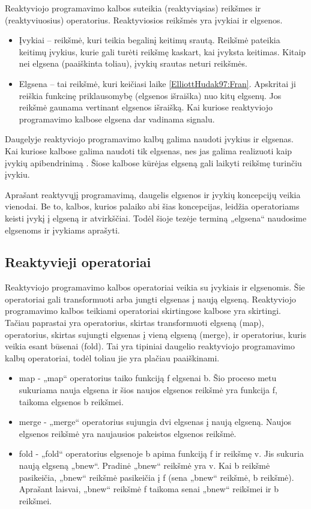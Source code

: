 Reaktyviojo programavimo kalbos suteikia (reaktyviąsias) reikšmes ir (reaktyviuosius) operatorius. Reaktyviosios reikšmės yra įvykiai ir elgsenos.

\begin{itemize}
  \item Įvykiai – reikšmė, kuri teikia begalinį keitimų srautą. Reikšmė pateikia keitimų įvykius, kurie gali turėti reikšmę kaskart, kai įvyksta keitimas. Kitaip nei elgsena (paaiškinta toliau), įvykių srautas neturi reikšmės.
  \item Elgsena – tai reikšmė, kuri keičiasi laike \ref{ElliottHudak97:Fran}. Apskritai ji reiškia funkcinę priklausomybę (elgsenos išraiška) nuo kitų elgsenų. Jos reikšmė gaunama vertinant elgsenos išraišką. Kai kuriose reaktyviojo programavimo kalbose elgsena dar vadinama signalu.
\end{itemize}

Daugelyje reaktyviojo programavimo kalbų galima naudoti įvykius ir elgsenas. Kai kuriose kalbose galima naudoti tik elgsenas, nes jas galima realizuoti kaip įvykių apibendrinimą \cite{Wan2002:EventDrivenFRP, CzaplickiC13:FRPGUI}. Šiose kalbose kūrėjas elgseną gali laikyti reikšmę turinčiu įvykiu.

Aprašant reaktyvųjį programavimą, daugelis elgsenos ir įvykių koncepcijų veikia vienodai. Be to, kalbos, kurios palaiko abi šias koncepcijas, leidžia operatoriams keisti įvykį į elgseną ir atvirkščiai. Todėl šioje tezėje terminą „elgsena“ naudosime elgsenoms ir įvykiams aprašyti.

\subsection{Reaktyvieji operatoriai}

Reaktyviojo programavimo kalbos operatoriai veikia su įvykiais ir elgsenomis. Šie operatoriai gali transformuoti arba jungti elgsenas į naują elgseną. Reaktyviojo programavimo kalbos teikiami operatoriai skirtingose kalbose yra skirtingi. Tačiau paprastai yra operatorius, skirtas transformuoti elgseną (map), operatorius, skirtas sujungti elgsenas į vieną elgseną (merge), ir operatorius, kuris veikia esant būsenai (fold). Tai yra tipiniai daugelio reaktyviojo programavimo kalbų operatoriai, todėl toliau jie yra plačiau paaiškinami.

\begin{itemize}
  \item map - „map“ operatorius taiko funkciją f elgsenai b. Šio proceso metu sukuriama nauja elgsena ir šios naujos elgsenos reikšmė yra funkcija f, taikoma elgsenos b reikšmei.
  \item merge - „merge“ operatorius sujungia dvi elgsenas į naują elgseną. Naujos elgsenos reikšmė yra naujausios pakeistos elgsenos reikšmė.
  \item fold - „fold“ operatorius elgsenoje b apima funkciją f ir reikšmę v. Jis sukuria naują elgseną „bnew“. Pradinė „bnew“ reikšmė yra v. Kai b reikšmė pasikeičia, „bnew“ reikšmė pasikeičia į f (sena „bnew“ reikšmė, b reikšmė). Aprašant laisvai, „bnew“ reikšmė f taikoma senai „bnew“ reikšmei ir b reikšmei.
\end{itemize}


